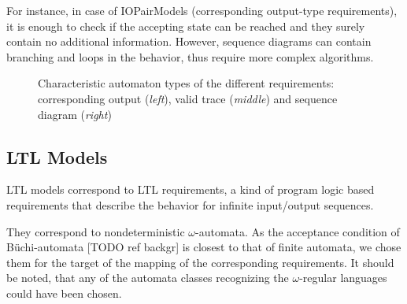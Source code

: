 For instance, in case of IOPairModels (corresponding output-type requirements), it is enough to check if the accepting state can be reached and they surely contain no additional information. However, sequence diagrams can contain branching and loops in the behavior, thus require more complex algorithms.

\begin{figure}[!ht] 
	\centering
	\caption{Characteristic automaton types of the different requirements: corresponding output (\textit{left}), valid trace (\textit{middle}) and sequence diagram (\textit{right})} 
	\label{fig_architcture_traceautomata}
\end{figure}

\subsection{LTL Models} \label{subs_ltlintheframework}

LTL models correspond to LTL requirements, a kind of program logic based requirements that describe the behavior for infinite input/output sequences.%

They correspond to nondeterministic $\omega$-automata. As the acceptance condition of Büchi-automata [TODO ref backgr] is closest to that of finite automata, we chose them for the target of the mapping of the corresponding requirements. It should be noted, that any of the automata classes recognizing the $\omega$-regular languages could have been chosen.

